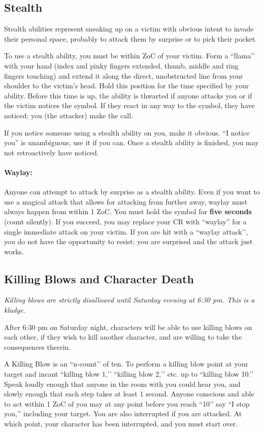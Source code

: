 \documentclass[sheet]{GL2020}
\begin{document}
\subsection{Stealth}

Stealth abilities represent sneaking up on a victim with obvious intent to invade their personal space, probably to attack them by surprise or to pick their pocket.

To use a stealth ability, you must be within ZoC of your victim. Form a ``llama’’ with your hand (index and pinky fingers extended, thumb, middle and ring fingers touching) and extend it along the direct, unobstructed line from your shoulder to the victim's head. Hold this position for the time specified by your ability. Before this time is up, the ability is thwarted if anyone attacks you or if the victim notices the symbol. If they react in any way to the symbol, they have noticed; you (the attacker) make the call.

If you notice someone using a stealth ability on you, make it obvious. ``I notice you'' is unambiguous; use it if you can. Once a stealth ability is finished, you may not retroactively have noticed.

\paragraph{Waylay:} Anyone can attempt to attack by surprise as a stealth ability. Even if you want to use a magical attack that allows for attacking from further away, waylay must always happen from within 1 ZoC. You must hold the symbol for \textbf{five seconds} (count silently). If you succeed, you may replace your CR with ``waylay'' for a single immediate attack on your victim. If you are hit with a ``waylay attack’’, you do not have the opportunity to resist; you are surprised and the attack just works.

\subsection{Killing Blows and Character Death}
\emph{Killing blows are strictly disallowed until Saturday evening at 6:30 pm. This is a kludge.}

After 6:30 pm on Saturday night, characters will be able to use killing blows on each other, if they wish to kill another character, and are willing to take the consequences therein.

A Killing Blow is an ``n-count’’ of ten. To perform a killing blow point at your target and incant ``killing blow 1,’’ ``killing blow 2,’’ etc. up to ``killing blow 10.’’ Speak loudly enough that anyone in the room with you could hear you, and slowly enough that each step takes at least 1 second. Anyone conscious and able to act within 1 ZoC of you may at any point before you reach ``10’’ say ``I stop you,’’ including your target. You are also interrupted if you are attacked. At which point, your character has been interrupted, and you must start over.
\end{document}
